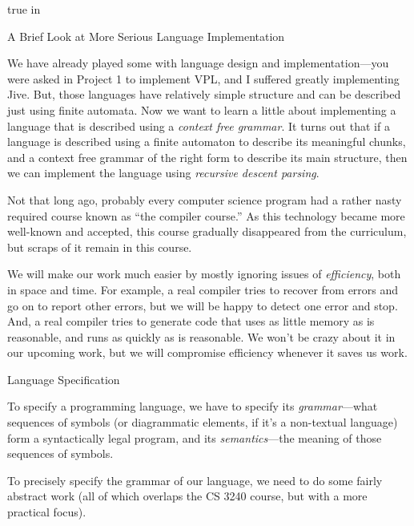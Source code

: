 


\advance {} true in

\def\inclassexercise{\item{$\Rightarrow$\quad\quad} {\bf In-Class Exercise:}\quad}
\def\borderline{\medskip\hrule\bigskip}


{\bigboldfont A Brief Look at More Serious Language Implementation}
\bigskip

We have already played some with language design and implementation---you were asked in Project 1
to implement VPL, and I suffered greatly implementing Jive.  But, those languages have relatively simple
structure and can be described just
using finite automata.  Now we want to learn a little about implementing a language that is described using
a {\it context free grammar}.    It turns out that if a language is described using a finite automaton to describe
its meaningful chunks, and a context free grammar of the right form to describe its main structure,
then we can implement the language using {\it recursive descent parsing}.
\bigskip

  Not that long ago,
  probably every computer science program had a rather nasty required course known as
 ``the compiler course.''    As this technology became more well-known and accepted, this
 course gradually disappeared from the curriculum, but scraps of it remain in this course.
 \medskip

 We will make our work much easier by mostly
 ignoring issues of {\it efficiency}, both in space and time.
 For example, a real compiler tries to recover from errors and go on to report other errors, but
 we will be happy to detect one error and stop.  And, a real compiler tries to generate code that
 uses as little memory as is reasonable, and runs as quickly as is reasonable.
 We won't be crazy about it in our upcoming work, but we will compromise efficiency whenever it saves us
 work.  
 \medskip
 \Outdent

{\bigboldfont Language Specification}
\bigskip

To specify a programming language, we have to specify its {\it grammar}---what sequences of symbols
(or diagrammatic elements, if it's a non-textual language) form a syntactically legal program, and its
{\it semantics}---the meaning of those sequences of symbols.
\medskip

To precisely specify the grammar of our language, we need to do some fairly abstract work (all of which overlaps the
CS 3240 course, but with a more practical focus).
\medskip

